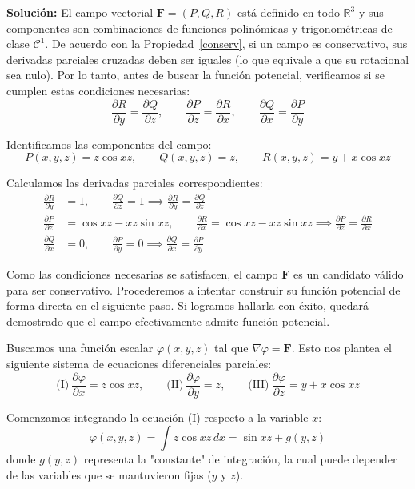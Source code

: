 \noindent\textbf{Solución:}  El campo vectorial $\mathbf{F} = (P, Q, R)$ está definido en todo $\mathbb{R}^3$ y sus componentes son combinaciones de funciones polinómicas y trigonométricas de clase $\mathcal{C}^1$. 
De acuerdo con la Propiedad~\ref{conserv}, si un campo es conservativo, sus derivadas parciales cruzadas deben ser iguales (lo que equivale a que su rotacional sea nulo).  Por lo tanto, antes de buscar la función potencial, verificamos si se cumplen estas condiciones necesarias:
\[ \frac{\partial R}{\partial y} = \frac{\partial Q}{\partial z}, \qquad \frac{\partial P}{\partial z} = \frac{\partial R}{\partial x}, \qquad \frac{\partial Q}{\partial x} = \frac{\partial P}{\partial y} \]

Identificamos las componentes del campo:
\[ P(x,y,z) = z\cos xz, \qquad Q(x,y,z) = z, \qquad R(x,y,z) = y + x\cos xz \]

Calculamos las derivadas parciales correspondientes:
\begin{align*}
    \frac{\partial R}{\partial y} &= 1, \qquad \frac{\partial Q}{\partial z} = 1 \implies \frac{\partial R}{\partial y} = \frac{\partial Q}{\partial z} \\
    \frac{\partial P}{\partial z} &= \cos xz - xz\sin xz, \qquad \frac{\partial R}{\partial x} = \cos xz - xz\sin xz \implies \frac{\partial P}{\partial z} = \frac{\partial R}{\partial x} \\
    \frac{\partial Q}{\partial x} &= 0, \qquad \frac{\partial P}{\partial y} = 0 \implies \frac{\partial Q}{\partial x} = \frac{\partial P}{\partial y}
\end{align*}

Como las condiciones necesarias se satisfacen, el campo $\mathbf{F}$ es un candidato válido para ser conservativo. Procederemos a intentar construir su función potencial de forma directa en el siguiente paso. Si logramos hallarla con éxito, quedará demostrado que el campo efectivamente admite función potencial.



Buscamos una función escalar $\varphi(x,y,z)$ tal que $\nabla\varphi = \mathbf{F}$. Esto nos plantea el siguiente sistema de ecuaciones diferenciales parciales:
\[ \text{(I)} \ \frac{\partial \varphi}{\partial x} = z\cos xz, \qquad \text{(II)} \ \frac{\partial \varphi}{\partial y} = z, \qquad \text{(III)} \ \frac{\partial \varphi}{\partial z} = y + x\cos xz \]

Comenzamos integrando la ecuación (I) respecto a la variable $x$:
\[ \varphi(x,y,z) = \int z\cos xz\, dx =\sin xz + g(y,z) \]
donde $g(y,z)$ representa la "constante" de integración, la cual puede depender de las variables que se mantuvieron fijas ($y$ y $z$).

